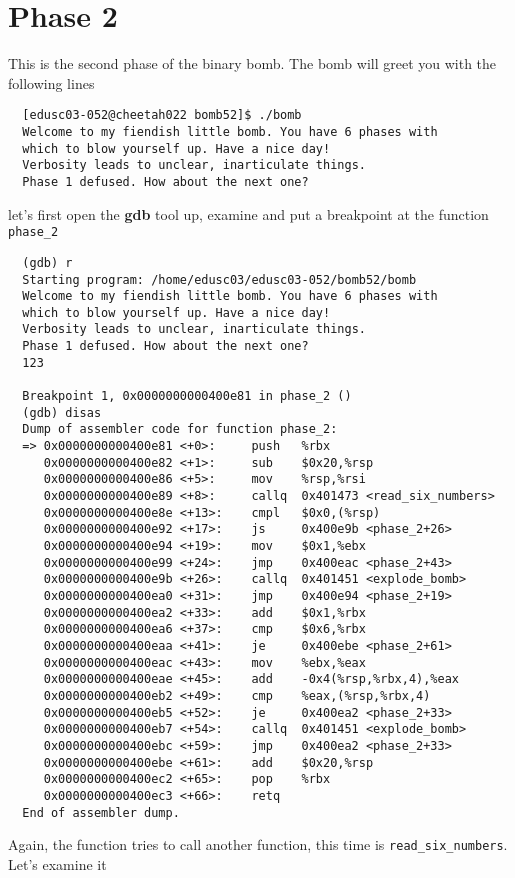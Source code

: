 \section{Phase 2}
This is the second phase of the binary bomb. The bomb will greet you with the following lines
\begin{verbatim}
  [edusc03-052@cheetah022 bomb52]$ ./bomb
  Welcome to my fiendish little bomb. You have 6 phases with
  which to blow yourself up. Have a nice day!
  Verbosity leads to unclear, inarticulate things.
  Phase 1 defused. How about the next one?
\end{verbatim}
let's first open the \textbf{gdb} tool up, examine and put a breakpoint at the function \verb+phase_2+
\begin{verbatim}
  (gdb) r
  Starting program: /home/edusc03/edusc03-052/bomb52/bomb
  Welcome to my fiendish little bomb. You have 6 phases with
  which to blow yourself up. Have a nice day!
  Verbosity leads to unclear, inarticulate things.
  Phase 1 defused. How about the next one?
  123

  Breakpoint 1, 0x0000000000400e81 in phase_2 ()
  (gdb) disas
  Dump of assembler code for function phase_2:
  => 0x0000000000400e81 <+0>:     push   %rbx
     0x0000000000400e82 <+1>:     sub    $0x20,%rsp
     0x0000000000400e86 <+5>:     mov    %rsp,%rsi
     0x0000000000400e89 <+8>:     callq  0x401473 <read_six_numbers>
     0x0000000000400e8e <+13>:    cmpl   $0x0,(%rsp)
     0x0000000000400e92 <+17>:    js     0x400e9b <phase_2+26>
     0x0000000000400e94 <+19>:    mov    $0x1,%ebx
     0x0000000000400e99 <+24>:    jmp    0x400eac <phase_2+43>
     0x0000000000400e9b <+26>:    callq  0x401451 <explode_bomb>
     0x0000000000400ea0 <+31>:    jmp    0x400e94 <phase_2+19>
     0x0000000000400ea2 <+33>:    add    $0x1,%rbx
     0x0000000000400ea6 <+37>:    cmp    $0x6,%rbx
     0x0000000000400eaa <+41>:    je     0x400ebe <phase_2+61>
     0x0000000000400eac <+43>:    mov    %ebx,%eax
     0x0000000000400eae <+45>:    add    -0x4(%rsp,%rbx,4),%eax
     0x0000000000400eb2 <+49>:    cmp    %eax,(%rsp,%rbx,4)
     0x0000000000400eb5 <+52>:    je     0x400ea2 <phase_2+33>
     0x0000000000400eb7 <+54>:    callq  0x401451 <explode_bomb>
     0x0000000000400ebc <+59>:    jmp    0x400ea2 <phase_2+33>
     0x0000000000400ebe <+61>:    add    $0x20,%rsp
     0x0000000000400ec2 <+65>:    pop    %rbx
     0x0000000000400ec3 <+66>:    retq
  End of assembler dump.
\end{verbatim}
Again, the function tries to call another function, this time is \verb+read_six_numbers+. Let's examine it
